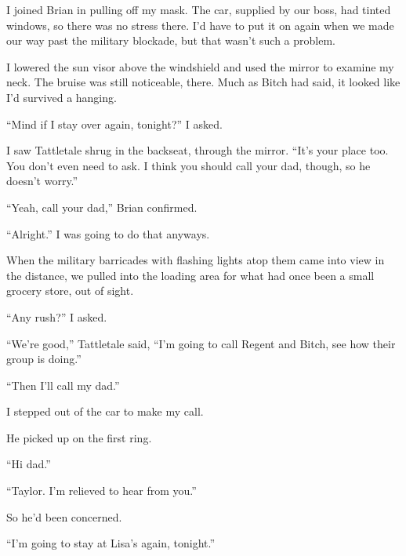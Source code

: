 I joined Brian in pulling off my mask.  The car, supplied by our boss, had tinted windows, so there was no stress there.  I'd have to put it on again when we made our way past the military blockade, but that wasn't such a problem.



I lowered the sun visor above the windshield and used the mirror to examine my neck.  The bruise was still noticeable, there.  Much as Bitch had said, it looked like I'd survived a hanging.



``Mind if I stay over again, tonight?'' I asked.



I saw Tattletale shrug in the backseat, through the mirror.  ``It's your place too.  You don't even need to ask.  I think you should call your dad, though, so he doesn't worry.''



``Yeah, call your dad,'' Brian confirmed.



``Alright.''  I was going to do that anyways.



When the military barricades with flashing lights atop them came into view in the distance, we pulled into the loading area for what had once been a small grocery store, out of sight.



``Any rush?'' I asked.



``We're good,'' Tattletale said, ``I'm going to call Regent and Bitch, see how their group is doing.''



``Then I'll call my dad.''



I stepped out of the car to make my call.



He picked up on the first ring.



``Hi dad.''



``Taylor.  I'm relieved to hear from you.''



So he'd been concerned.



``I'm going to stay at Lisa's again, tonight.''



